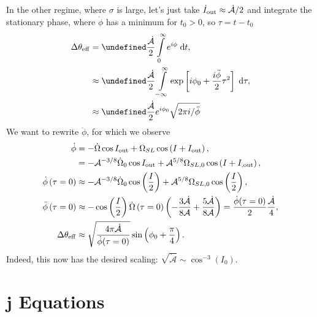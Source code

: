 \documentclass[11pt,
        usenames, %
        dvipsnames %
    ]{article}
\newcommand*{\bm}[1]{\boldsymbol{\mathbf{#1}}}
\let\Im\undefined
\DeclareMathOperator{\Im}{Im}
\newcommand*{\p}[1]{\left(#1\right)}
\newcommand*{\s}[1]{\left[#1\right]}
\begin{document}
In the other regime, where $\sigma$ is large, let's just take $\dot{I}_{\rm out}
\approx \dot{\mathcal{A}} / 2$ and integrate the stationary phase, where
$\dot{\phi}$ has a minimum for $t_0 > 0$, so $\tau = t - t_0$
\begin{align}
    \Delta \theta_{\rm eff} &= \Im \frac{\dot{\mathcal{A}}}{2}
            \int\limits_{0}^\infty e^{i\phi}\;\mathrm{d}t,\\
        &\approx \Im \frac{\dot{\mathcal{A}}}{2}
            \int\limits_{-\infty}^\infty \exp\s{
                i\phi_0 + \frac{i\ddot{\phi}}{2}\tau^2}\;\mathrm{d}\tau,\\
        &\approx \Im \frac{\dot{\mathcal{A}}}{2} e^{i\phi_0}
            \sqrt{2\pi i/\ddot{\phi}}
\end{align}
We want to rewrite $\ddot{\phi}$, for which we observe
\begin{align}
    \dot{\phi} &= -\dot{\Omega} \cos I_{\rm out}
            + \Omega_{SL} \cos \p{I + I_{\rm out}},\\
        &= -\mathcal{A}^{-3/8}\dot{\Omega}_0 \cos I_{\rm out}
            + \mathcal{A}^{5/8}\Omega_{SL, 0}\cos \p{I + I_{\rm, out}},\\
    \dot{\phi}\p{\tau = 0} &\approx
        -\mathcal{A}^{-3/8}\dot{\Omega}_0 \cos\p{\frac{I}{2}}
            + \mathcal{A}^{5/8}\Omega_{SL, 0}\cos \p{\frac{I}{2}},\\
    \ddot{\phi}\p{\tau = 0} &\approx
        -\cos \p{\frac{I}{2}} \dot{\Omega}\p{\tau = 0}
            \p{-\frac{3\dot{\mathcal{A}}}{8\mathcal{A}}
                + \frac{5\dot{\mathcal{A}}}{8\mathcal{A}}}
                = \frac{\dot{\phi}(\tau = 0)}{2}\frac{\dot{\mathcal{A}}}{4},\\
    \Delta \theta_{\rm eff} &\approx
        \sqrt{\frac{4\pi \dot{\mathcal{A}}}{\dot{\phi}(\tau = 0)}}
            \sin\p{\phi_0 +  \frac{\pi}{4}}.
\end{align}
Indeed, this now has the desired scaling: $\sqrt{\dot{\mathcal{A}}} \sim
\cos^{-3}(I_0)$.

\appendix

\section{$\bm{j}$ Equations}
\end{document}

